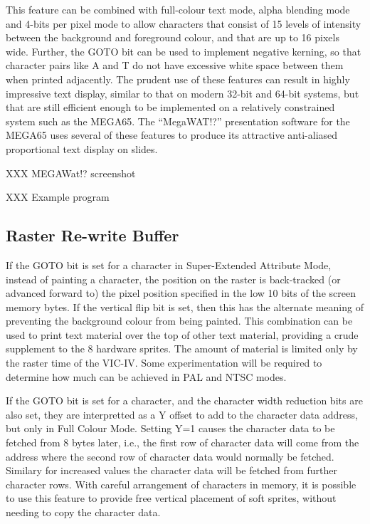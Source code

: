 This feature can be combined with full-colour text mode, alpha blending mode and 4-bits per pixel mode to allow characters that consist of
15 levels of intensity between the background and foreground colour, and that are up to 16 pixels wide.  Further, the GOTO bit can be used to implement negative kerning, so that character pairs like A and T do not have excessive white space between them when printed adjacently. The prudent use of these features can result in highly impressive text display, similar to that on modern 32-bit and 64-bit systems, but that are still efficient enough to be implemented on a relatively constrained system such as the MEGA65. The ``MegaWAT!?'' presentation software for the MEGA65 uses several of these features to produce its attractive anti-aliased proportional text display on slides.

XXX MEGAWat!? screenshot

XXX Example program

\subsection{Raster Re-write Buffer}

If the GOTO bit is set for a character in Super-Extended Attribute Mode, instead of painting a character, the position on the raster is back-tracked (or advanced forward to) the
pixel position specified in the low 10 bits of the screen memory bytes.  If the vertical flip bit is set, then this has the alternate
meaning of preventing the background colour from being painted.  This combination can be used to print text material over the top of
other text material, providing a crude supplement to the 8 hardware sprites.  The amount of material is limited only by the raster
time of the VIC-IV. Some experimentation will be required to determine how much can be achieved in PAL and NTSC modes.

If the GOTO bit is set for a character, and the character width reduction bits are also set, they are interpretted as a Y offset to add to the character data address, but only in Full Colour Mode.  Setting Y=1 causes the character data to be fetched from 8 bytes later, i.e., the first row of character data will come from the address where the second row of character data would normally be fetched.  Similary for increased values the character data will be fetched from further character rows.  With careful arrangement of characters in memory, it is possible to use this feature to provide free vertical placement of soft sprites, without needing to copy the character data.


